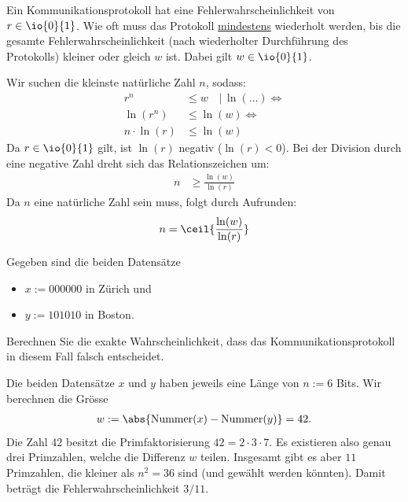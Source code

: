\begin{questions}
	\question[3]

	Ein Kommunikationsprotokoll hat eine Fehlerwahrscheinlichkeit von $r\in\io{0}{1}$. Wie oft muss das Protokoll \underline{mindestens} wiederholt werden, bis die gesamte Fehlerwahrscheinlichkeit (nach wiederholter Durchführung des Protokolls) kleiner oder gleich $w$ ist. Dabei gilt $w\in\io{0}{1}$.
	\begin{solution}
		Wir suchen die kleinste natürliche Zahl $n$, sodass:
		\begin{align*}
			r^n         & \leq w \quad \Big| \, \ln(\dots) \iff \tag{Logarithmieren} \\
			\ln(r^n)    & \leq \ln(w) \iff \\
			n \cdot \ln(r) & \leq \ln(w)
		\end{align*}
		Da $r \in \io{0}{1}$ gilt, ist $\ln(r)$ negativ ($\ln(r) < 0$). Bei der Division durch eine negative Zahl dreht sich das Relationszeichen um:
		\begin{align*}
			n & \geq \frac{\ln(w)}{\ln(r)}
		\end{align*}
		Da $n$ eine natürliche Zahl sein muss, folgt durch Aufrunden:
		\begin{align*}
			n = \ceil{\frac{\ln(w)}{\ln(r)}}
		\end{align*}
	\end{solution}

	\question[3] Gegeben sind die beiden Datensätze
	\begin{itemize}
		\item $x := 000000$ in Zürich und
		\item $y := 101010$ in Boston.
	\end{itemize}
	Berechnen Sie die exakte Wahrscheinlichkeit, dass das Kommunikationsprotokoll in diesem Fall falsch entscheidet.
	\begin{solution}
		Die beiden Datensätze $x$ und $y$ haben jeweils eine Länge von $n := 6$ Bits.
		Wir berechnen die Grösse
		\begin{align*}
			w := \abs{\text{Nummer}(x) - \text{Nummer}(y)} = 42.
		\end{align*}
		Die Zahl $42$ besitzt die Primfaktorisierung $42 = 2\cdot 3\cdot 7$. Es existieren also genau drei Primzahlen, welche die Differenz $w$ teilen. Insgesamt gibt es aber $11$ Primzahlen, die kleiner als $n^2 = 36$ sind (und gewählt werden könnten). Damit beträgt die Fehlerwahrscheinlichkeit $3/11$.
	\end{solution}


\end{questions}
